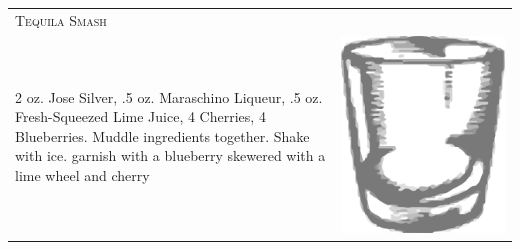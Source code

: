 \documentclass{article}
\begin{document}
\begin{tabular}{p{2in} p{0.5in}}
  \multicolumn{2}{p{3in}}{\centering\Huge\textsc{Tequila Smash}} \\ 
  
   \vspace{-0.1in}2 oz. Jose Silver, .5 oz. Maraschino Liqueur, .5
    oz. Fresh-Squeezed Lime Juice, 4 Cherries, 4 Blueberries. Muddle
    ingredients together. Shake with ice.  garnish with a blueberry
    skewered with a lime wheel and cherry &
   \vspace{-0.1in} \includegraphics{rocks_glass.png}
\end{tabular}
\end{document}
